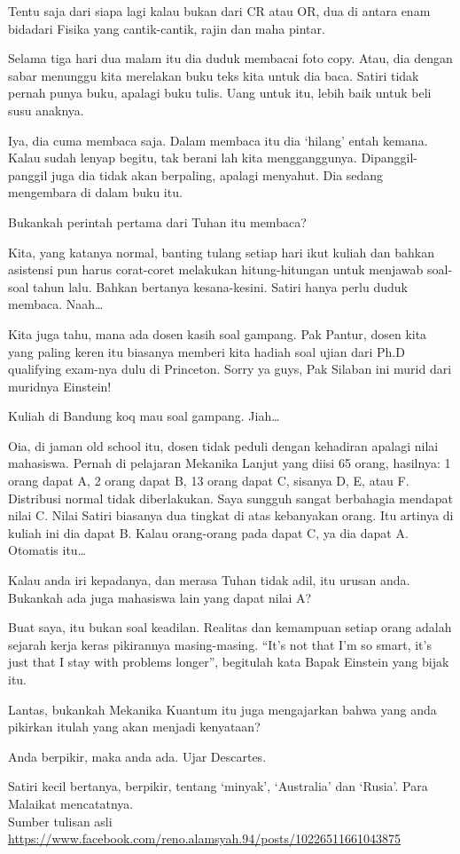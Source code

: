 Tentu saja dari siapa lagi kalau bukan dari CR atau OR, dua di antara enam bidadari Fisika yang cantik-cantik, rajin dan maha pintar.

Selama tiga hari dua malam itu dia duduk membacai foto copy. Atau, dia dengan sabar menunggu kita merelakan buku teks kita untuk dia baca. Satiri tidak pernah punya buku, apalagi buku tulis. Uang untuk itu, lebih baik untuk beli susu anaknya.

Iya, dia cuma membaca saja. Dalam membaca itu dia ‘hilang’ entah kemana. Kalau sudah lenyap begitu, tak berani lah kita mengganggunya. Dipanggil-panggil juga dia tidak akan berpaling, apalagi menyahut. Dia sedang mengembara di dalam buku itu.

Bukankah perintah pertama dari Tuhan itu membaca?

Kita, yang katanya normal, banting tulang setiap hari ikut kuliah dan bahkan asistensi pun harus corat-coret melakukan hitung-hitungan untuk menjawab soal-soal tahun lalu. Bahkan bertanya kesana-kesini. Satiri hanya perlu duduk membaca. Naah…

Kita juga tahu, mana ada dosen kasih soal gampang. Pak Pantur, dosen kita yang paling keren itu biasanya memberi kita hadiah soal ujian dari Ph.D qualifying exam-nya dulu di Princeton. Sorry ya guys, Pak Silaban ini murid dari muridnya Einstein!

Kuliah di Bandung koq mau soal gampang. Jiah…

Oia, di jaman old school itu, dosen tidak peduli dengan kehadiran apalagi nilai mahasiswa. Pernah di pelajaran Mekanika Lanjut yang diisi 65 orang, hasilnya: 1 orang dapat A, 2 orang dapat B, 13 orang dapat C, sisanya D, E, atau F. Distribusi normal tidak diberlakukan. Saya sungguh sangat berbahagia mendapat nilai C. Nilai Satiri biasanya dua tingkat di atas kebanyakan orang. Itu artinya di kuliah ini dia dapat B. Kalau orang-orang pada dapat C, ya dia dapat A. Otomatis itu…

Kalau anda iri kepadanya, dan merasa Tuhan tidak adil, itu urusan anda. Bukankah ada juga mahasiswa lain yang dapat nilai A?

Buat saya, itu bukan soal keadilan. Realitas dan kemampuan setiap orang adalah sejarah kerja keras pikirannya masing-masing. “It’s not that I’m so smart, it’s just that I stay with problems longer”, begitulah kata Bapak Einstein yang bijak itu.

Lantas, bukankah Mekanika Kuantum itu juga mengajarkan bahwa yang anda pikirkan itulah yang akan menjadi kenyataan?

Anda berpikir, maka anda ada. Ujar Descartes.

Satiri kecil bertanya, berpikir, tentang ‘minyak’, ‘Australia’ dan ‘Rusia’. Para Malaikat mencatatnya.
\\[10pt]

Sumber tulisan asli \url{https://www.facebook.com/reno.alamsyah.94/posts/10226511661043875}

